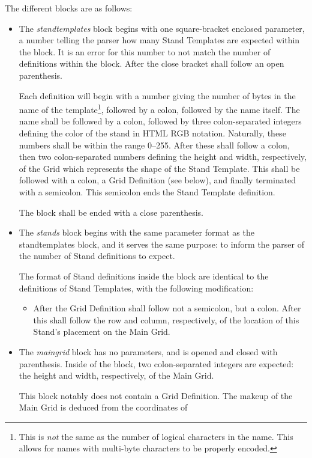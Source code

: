 \documentclass{report}
\begin{document}
The different blocks are as follows:
\begin{itemize}
	\item The \emph{standtemplates} block begins with one square-bracket
		enclosed parameter, a number telling the parser how many
		Stand Templates are expected within the block. It is an error
		for this number to not match the number of definitions within
		the block. After the close bracket shall follow an open
		parenthesis.

		Each definition will begin with a number giving the number of
		bytes in the name of the template\footnote{This is \emph{not}
			the same as the number of logical characters in the
			name. This allows for names with multi-byte characters
		to be properly encoded.}, followed by a colon,
		followed by the name itself. The name shall be followed by
		a colon, followed by three colon-separated integers 
		defining the color of the stand in HTML RGB notation.
		Naturally, these numbers shall be within the range 0--255.
		After these shall follow a colon, then two colon-separated
		numbers defining the height and width, respectively, of
		the Grid which represents the shape of the Stand Template. This
		shall be followed with a colon, a Grid Definition (see below),
		and finally terminated with a semicolon. This semicolon ends
		the Stand Template definition.

		The block shall be ended with a close parenthesis.
	\item The \emph{stands} block begins with the same parameter format as
		the standtemplates block, and it serves the same purpose:
		to inform the parser of the number of Stand definitions to
		expect.

		The format of Stand definitions inside the block are
		identical to the definitions of Stand Templates, with the
		following modification:
		\begin{itemize}
			\item After the Grid Definition shall follow not a
				semicolon, but a colon. After this shall
				follow the row and column, respectively, of
				the location of this Stand's placement
				on the Main Grid.
		\end{itemize}
	\item The \emph{maingrid} block has no parameters, and is opened
		and closed with parenthesis. Inside of the
		block, two colon-separated integers are expected: the
		height and width, respectively, of the Main Grid.

		This block notably does not contain a Grid Definition. The
		makeup of the Main Grid is deduced from the coordinates of
\end{itemize}
\end{document}
